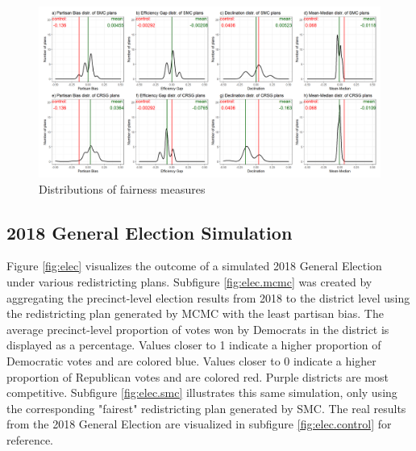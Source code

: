 
\begin{landscape}
    \begin{figure}
     \centering
     \includegraphics{img/fair.density.png}
     \caption{Distributions of fairness measures}
     \label{fig:fair.density}
    \end{figure}
   \end{landscape}

\subsection{2018 General Election Simulation}


Figure \ref{fig:elec} visualizes the outcome of a simulated 2018 General Election under various redistricting plans. Subfigure \ref{fig:elec.mcmc} was created by aggregating the precinct-level election results from 2018 to the district level using the redistricting plan generated by MCMC with the least partisan bias. The average precinct-level proportion of votes won by Democrats in the district is displayed as a percentage. Values closer to 1 indicate a higher proportion of Democratic votes and are colored blue. Values closer to 0 indicate a higher proportion of Republican votes and are colored red. Purple districts are most competitive. Subfigure \ref{fig:elec.smc} illustrates this same simulation, only using the corresponding "fairest" redistricting plan generated by SMC. The real results from the 2018 General Election are visualized in subfigure \ref{fig:elec.control} for reference. 